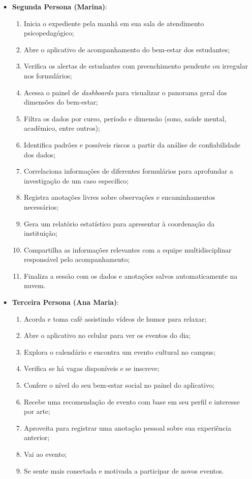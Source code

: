 \begin{itemize}
    \item \textbf{Segunda Persona (Marina)}:
    \begin{enumerate}
        \item Inicia o expediente pela manhã em sua sala de atendimento psicopedagógico;
        \item Abre o aplicativo de acompanhamento do bem-estar dos estudantes;
        \item Verifica os alertas de estudantes com preenchimento pendente ou irregular nos formulários;
        \item Acessa o painel de \textit{dashboards} para visualizar o panorama geral das dimensões do bem-estar;
        \item Filtra os dados por curso, período e dimensão (sono, saúde mental, acadêmico, entre outros);
        \item Identifica padrões e possíveis riscos a partir da análise de confiabilidade dos dados;
        \item Correlaciona informações de diferentes formulários para aprofundar a investigação de um caso específico;
        \item Registra anotações livres sobre observações e encaminhamentos necessários;
        \item Gera um relatório estatístico para apresentar à coordenação da instituição;
        \item Compartilha as informações relevantes com a equipe multidisciplinar responsável pelo acompanhamento;
        \item Finaliza a sessão com os dados e anotações salvos automaticamente na nuvem.
    \end{enumerate}

    \item \textbf{Terceira Persona (Ana Maria)}:
    \begin{enumerate}
        \item Acorda e toma café assistindo vídeos de humor para relaxar;
        \item Abre o aplicativo no celular para ver os eventos do dia;
        \item Explora o calendário e encontra um evento cultural no campus;
        \item Verifica se há vagas disponíveis e se inscreve;
        \item Confere o nível do seu bem-estar social no painel do aplicativo;
        \item Recebe uma recomendação de evento com base em seu perfil e interesse por arte;
        \item Aproveita para registrar uma anotação pessoal sobre sua experiência anterior;
        \item Vai ao evento;
        \item Se sente mais conectada e motivada a participar de novos eventos.
    \end{enumerate}
\end{itemize}



